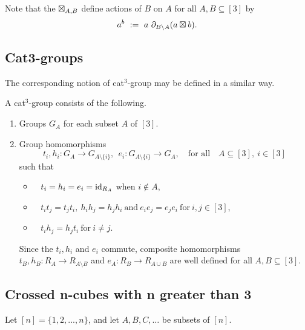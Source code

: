 \noindent
Note that the $\boxtimes_{A,B}$ define actions of $B$ on $A$ for all 
$A,B \subseteq [3]$ by
$$
a^b ~:=~ a\ \partial_{B \setminus A}(a \boxtimes b).
$$



\subsection{Cat3-groups}  

The corresponding notion of cat$^3$-group may be defined in a similar way.

\begin{defn} 
A cat$^3$-group consists of the following.
\begin{enumerate}[{\rm (i)}]
\item
Groups  $G_A$  for each subset  $A$  of  $[3]$. 

\item
Group homomorphisms
$$
t_i, h_i : G_A \to G_{A \setminus \{i\}}, ~~
e_i : G_{A \setminus \{i\}} \to G_A,
\quad\mbox{for all} \quad 
A \subseteq [3],~ i \in [3]
$$
such that
\begin{itemize}
\item~  
$t_i = h_i = e_i = \mathrm{id}_{R_A}$  when  $i \notin A$,
\item~ 
$t_i t_j = t_j t_i,~
 h_i h_j = h_j h_i ~\mbox{and}~
 e_i e_j = e_j e_i ~\mbox{for}~ i,j \in [3]$,
\item~
$t_i h_j = h_j t_i ~\mbox{for}~ i \neq j$.
\end{itemize}

\noindent
Since the $t_i, h_i$ and $e_i$ commute, composite homomorphisms
$t_B, h_B : R_A \to R_{A \setminus B}$ and 
$e_A : R_B \to R_{A \cup B}$ 
are well defined for all $A,B \subseteq [3]$.
\end{enumerate}
\end{defn}



\vspace{12mm}
\subsection{Crossed n-cubes with n greater than 3} 

Let $[n] = \{1,2,...,n\}$, and let $A,B,C,\ldots$ be subsets of $[n]$.

